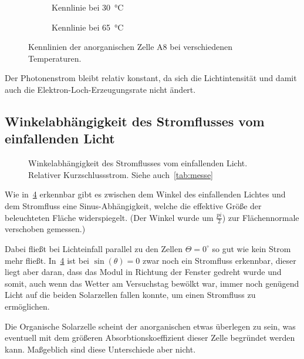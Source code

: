 \documentclass[slug=SZ, room=Hermann-Krone-Bau\,\ Labor\ 1.25,
supervisor=Martin\ Kroll, coursedate=14.\ 11.\ 2019]{../../Lab_Report_LaTeX/lab_report}
\begin{document}
\begin{figure}[H]\centering
  \begin{subfigure}[b]{1\textwidth}\centering
    
    \caption{Kennlinie bei \SI{30}{\degreeCelsius}}
    \label{diag:t30}
  \end{subfigure}
  \begin{subfigure}[b]{1\textwidth}\centering
    
    \caption{Kennlinie bei \SI{65}{\degreeCelsius}}
    \label{diag:t65}
  \end{subfigure}
  \caption{Kennlinien der anorganischen Zelle A8 bei verschiedenen
    Temperaturen.}
  \label{fig:tempccurves}
\end{figure}

Der Photonenstrom bleibt relativ konstant, da sich die Lichtintensität
und damit auch die Elektron-Loch-Erzeugungsrate nicht \"andert.

\subsection{Winkelabhängigkeit des Stromflusses vom einfallenden Licht}
\label{sec:winkel}

\begin{figure}[H]\centering
        
        \caption{Winkelabhängigkeit des Stromflusses vom einfallenden
          Licht. Relativer Kurzschlussstrom. Siehe auch~\ref{tab:messe}}
        \label{fig:winkel}
\end{figure}

Wie in~\ref{fig:winkel} erkennbar gibt es zwischen dem Winkel des
einfallenden Lichtes und dem Stromfluss eine Sinus-Abhängigkeit,
welche die effektive Gr\"o\ss{}e der beleuchteten Fl\"ache
widerspiegelt. (Der Winkel wurde um \(\frac{pi}{2}\)) zur
Fl\"achennormale verschoben gemessen.)

Dabei flie\ss{}t bei Lichteinfall parallel zu den Zellen
\(\Theta=0^\circ\) so gut wie kein Strom mehr fließt.
In~\ref{fig:winkel} ist bei \(\sin(\theta) = 0\) zwar noch ein
Stromfluss erkennbar, dieser liegt aber daran, dass das Modul in
Richtung der Fenster gedreht wurde und somit, auch wenn das Wetter am
Versuchstag bewölkt war, immer noch genügend Licht auf die beiden
Solarzellen fallen konnte, um einen Stromfluss zu ermöglichen.

Die Organische Solarzelle scheint der anorganischen etwas \"uberlegen
zu sein, was eventuell mit dem gr\"o\ss{}eren Absorbtionskoeffizient
dieser Zelle begr\"undet werden kann. Ma\ss{}geblich sind diese
Unterschiede aber nicht.
\end{document}
